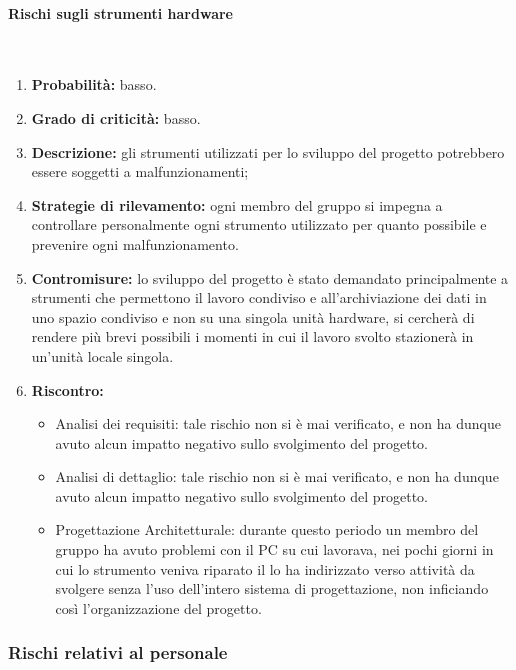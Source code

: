 \paragraph{Rischi sugli strumenti hardware}\mbox{}\\
\begin{enumerate}
	\item \textbf{Probabilità:} basso.
	\item \textbf{Grado di criticità:} basso.
	\item \textbf{Descrizione:} gli strumenti utilizzati per lo sviluppo del progetto potrebbero essere soggetti a malfunzionamenti;
	\item \textbf{Strategie di rilevamento:} ogni membro del gruppo si impegna a controllare personalmente ogni strumento utilizzato per quanto possibile e prevenire ogni malfunzionamento.
	\item \textbf{Contromisure:} lo sviluppo del progetto è stato demandato principalmente a strumenti che permettono il lavoro condiviso e all’archiviazione dei dati in uno spazio condiviso e non su una singola unità hardware, si cercherà di rendere più brevi possibili i momenti in cui il lavoro svolto stazionerà in un’unità locale singola.
	\item \textbf{Riscontro:} 
	\begin{itemize}
		\item Analisi dei requisiti: tale rischio non si è mai verificato, e non ha dunque avuto alcun impatto negativo sullo svolgimento del progetto.
		\item Analisi di dettaglio: tale rischio non si è mai verificato, e non ha dunque avuto alcun impatto negativo sullo svolgimento del progetto.
		\item Progettazione Architetturale: durante questo periodo un membro del gruppo ha avuto problemi con il PC su cui lavorava, nei pochi giorni in cui lo strumento veniva riparato il \Responsabile{} lo ha indirizzato verso attività da svolgere senza l’uso dell’intero sistema di progettazione, non inficiando così l'organizzazione del progetto.
	\end{itemize}
\end{enumerate}

\subsubsection{Rischi relativi al personale}
